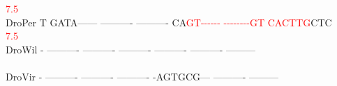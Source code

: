 \documentclass[11pt,twoside,reqno,a4paper]{article}
\begin{document}
{\hspace*{7\charwidth}\hspace*{1\charwidth}\hspace*{1\charwidth}\hspace*{1\charwidth}\hspace*{1\charwidth}\hspace*{33\charwidth}\textcolor{Red}{7.5}\hspace*{1\charwidth}\hspace*{1\charwidth}\\
DroPer	T	GATA------	----------	----------	CA\textcolor{Red}{G}\textcolor{Red}{T}\textcolor{Red}{-}\textcolor{Red}{-}\textcolor{Red}{-}\textcolor{Red}{-}\textcolor{Red}{-}\textcolor{Red}{-}	\textcolor{Red}{-}\textcolor{Red}{-}\textcolor{Red}{-}\textcolor{Red}{-}\textcolor{Red}{-}\textcolor{Red}{-}\textcolor{Red}{-}\textcolor{Red}{-}\textcolor{Red}{G}\textcolor{Red}{T}	\textcolor{Red}{C}\textcolor{Red}{A}\textcolor{Red}{C}\textcolor{Red}{T}\textcolor{Red}{T}\textcolor{Red}{G}CTC\\
\hspace*{7\charwidth}\hspace*{1\charwidth}\hspace*{1\charwidth}\hspace*{1\charwidth}\hspace*{1\charwidth}\hspace*{33\charwidth}\textcolor{Red}{7.5}\hspace*{1\charwidth}\hspace*{1\charwidth}\\
DroWil	-	----------	----------	----------	----------	----------	---------\\
\hspace*{7\charwidth}\hspace*{1\charwidth}\hspace*{1\charwidth}\hspace*{1\charwidth}\hspace*{1\charwidth}\hspace*{1\charwidth}\hspace*{1\charwidth}\\
DroVir	-	----------	----------	----------	-AGTGCG---	----------	---------\\
\hspace*{7\charwidth}\hspace*{1\charwidth}\hspace*{1\charwidth}\hspace*{1\charwidth}\hspace*{1\charwidth}\hspace*{1\charwidth}\hspace*{1\charwidth}\\
}
\end{document}
